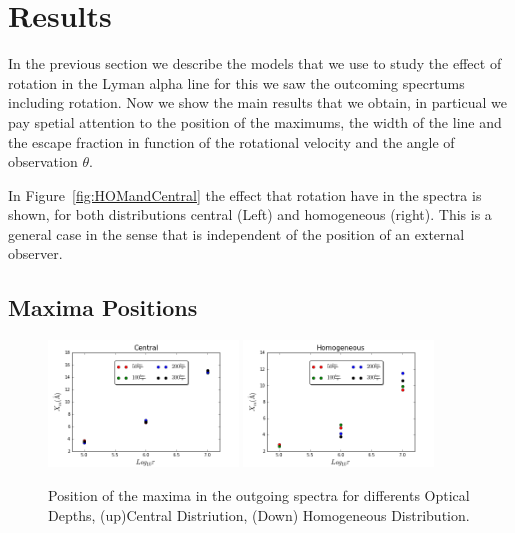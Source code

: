 \documentclass[usenatbib]{mn2e}
\begin{document}



\section{Results}
\label{sec:Results}



In the previous section we describe the models that we use to study the
effect of rotation in the Lyman alpha line for this we saw the outcoming specrtums including rotation. Now we show the main results that we
obtain, in particual we pay spetial attention to the position of the
maximums, the width of the line and the escape fraction in function of
the rotational velocity and the angle of observation $\theta$.  

In Figure~\ref{fig:HOMandCentral} the effect that rotation have in the spectra is shown,
for both distributions central (Left) and homogeneous (right). This is
a general case in the sense that is independent of the position of an
external observer.  

\subsection{Maxima Positions}
\label{sec:MP}

\begin{figure}
    \includegraphics[width=0.45\textwidth]{maximumvsODDifSpeedsCentral.png}
    \includegraphics[width=0.45\textwidth]{maximumvsODDifSpeedsHOM.png}
  \label{figure:maximavsOD}\caption{Position of the maxima in the outgoing spectra for differents Optical Depths, (up)Central Distriution, (Down) Homogeneous Distribution.}
\end{figure}
\end{document}
